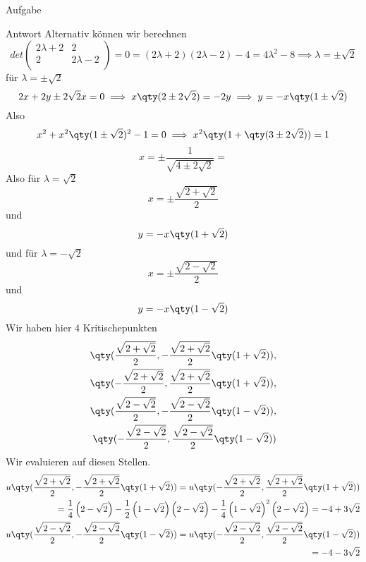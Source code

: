 \documentclass{scrartcl}
\begin{document}
\begin{section}{Aufgabe}
\begin{subsection}{Antwort}
Alternativ können wir berechnen \[det\begin{pmatrix}
 2 \lambda +2 & 2 \\
 2 & 2 \lambda -2 \\
\end{pmatrix}=0=(2 \lambda +2)(2 \lambda -2)-4=4 \lambda ^2-8\implies \lambda = \pm \sqrt{2}
\]
für $\lambda =\pm \sqrt{2}$
\[2x+2y\pm 2\sqrt{2} x =0 \implies x\qty(2\pm 2 \sqrt{2})=-2 y \implies y=-x\qty(1\pm \sqrt{2})\]
Also
\[x^2+x^2\qty(1\pm \sqrt{2})^2-1=0\implies x^2\qty(1+\qty(3\pm 2\sqrt{2}))=1\]
\[x=\pm\frac{1}{\sqrt{4\pm 2\sqrt{2}}}=\]
Also für $\lambda = \sqrt{2}$
\[x=\pm \frac{\sqrt{2+\sqrt{2}}}{2}\] 
und \[y=-x\qty(1+ \sqrt{2})\]
und für $\lambda = - \sqrt{2}$
\[x=\pm \frac{\sqrt{2-\sqrt{2}}}{2}\]
und \[y=-x\qty(1- \sqrt{2})\]
\newcommand{\xone}{\frac{\sqrt{2+\sqrt{2}}}{2}}
\newcommand{\xtwo}{\frac{\sqrt{2-\sqrt{2}}}{2}}
\newcommand{\yone}{\xone\qty(1+ \sqrt{2})}
\newcommand{\ytwo}{\xtwo\qty(1- \sqrt{2})}
Wir haben hier 4 Kritischepunkten
\begin{align*}
  \qty(\xone,-\yone),\\
  \qty(-\xone,\yone),\\
  \qty(\xtwo,-\ytwo),\\
  \qty(-\xtwo,\ytwo)  
\end{align*}
Wir evaluieren auf diesen Stellen.
\begin{align*}
    u\qty(\xone,-\yone)=u\qty(-\xone,\yone)\\
    =\frac{1}{4} \left(2-\sqrt{2}\right)-\frac{1}{2} \left(1-\sqrt{2}\right)
   \left(2-\sqrt{2}\right)-\frac{1}{4} \left(1-\sqrt{2}\right)^2 \left(2-\sqrt{2}\right)=-4 + 3 \sqrt{2}\\
   u\qty(\xtwo,-\ytwo)=u\qty(-\xtwo,\ytwo)\\
   =-4 - 3 \sqrt{2}
\end{align*}

    \end{subsection}
\end{section}
\end{document}
